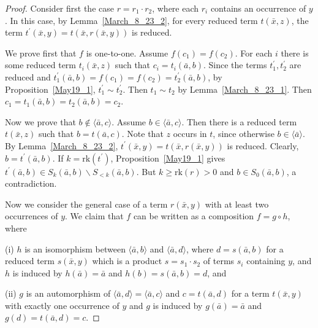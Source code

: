 \documentclass[10pt,a4paper]{article}
\newcommand{\rk}{\mathrm{rk}}
\theoremstyle{note}
\begin{document}
\begin{proof} Consider first the case  $r= r_1\cdot r_2$, where each $r_i$ contains an occurrence of $y$.  In this case, by Lemma~\ref{March_8_23_2}, for every reduced term $t(\bar{x},z)$,  the term $t^\prime(\bar{x},y)= t(\bar{x},r(\bar{x},y))$ is reduced. 

We prove first that $f$ is one-to-one.  Assume $f(c_1)= f(c_2)$. For each $i$ there is some reduced term $t_i(\bar{x},z)$  such that  $c_i= t_i(\bar{a},b)$.  Since the terms $t_1^\prime,t_2^\prime$ are reduced and  $t_1^\prime(\bar{a},b)= f(c_1)= f(c_2)=t_2^\prime(\bar{a},b)$, by  Proposition~\ref{May19_1},  $t_1^\prime\sim t_2^\prime$.  Then  $t_1\sim t_2$ by Lemma~\ref{March_8_23_1}. Then  $c_1=t_1(\bar{a},b)=t_2(\bar{a},b)= c_2$.

Now we prove that $b\not\in \langle\bar{a},c\rangle$. Assume $b\in\langle\bar{a},c\rangle$. Then there is a reduced term $t(\bar{x},z)$ such that $b= t(\bar{a},c)$. Note that $z$ occurs in $t$, since otherwise $b\in\langle \bar{a}\rangle$.  By Lemma~\ref{March_8_23_2},  $t^\prime(\bar{x},y)= t(\bar{x},r(\bar{x},y))$ is reduced. Clearly, $b= t^\prime(\bar{a},b)$.  If $k=\rk(t^\prime)$, Proposition~\ref{May19_1} gives  $t^\prime(\bar{a},b)\in S_k(\bar{a},b)\smallsetminus S_{<k}(\bar{a},b)$.  But $k\geq \rk(r) >0$ and  $b\in S_0(\bar{a},b)$, a contradiction.

Now we consider the general case of a term $r(\bar{x},y)$  with at least two occurrences of $y$.  We claim that $f$ can be written as a composition $f=g\circ h$, where

(i)  $h$  is an isomorphism between $\langle \bar{a},b\rangle$ and $\langle \bar{a},d\rangle$,  where $d= s(\bar{a},b)$  for a reduced term  $s(\bar{x},y)$  which is a product  $s=s_1\cdot s_2$ of terms $s_i$ containing $y$,   and  $h$ is induced by  $h(\bar{a})= \bar{a}$  and $h(b)=s(\bar{a},b)=d$,  and

(ii) $g$ is an automorphism of  $\langle \bar{a},d\rangle =\langle\bar{a},c\rangle$ and  $c= t(\bar{a},d)$  for a term $t(\bar{x},y)$  with exactly one occurrence of $y$  and  $g$ is induced by $g(\bar{a})=\bar{a}$  and  $g(d)=t(\bar{a},d)= c$.


\end{proof}
\end{document}
